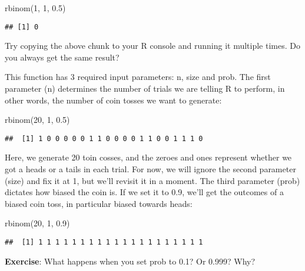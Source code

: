 \documentclass[
]{book}
\newenvironment{Shaded}{\begin{snugshade}}{\end{snugshade}}
\newcommand{\DecValTok}[1]{\textcolor[rgb]{0.00,0.00,0.81}{#1}}
\newcommand{\FloatTok}[1]{\textcolor[rgb]{0.00,0.00,0.81}{#1}}
\newcommand{\FunctionTok}[1]{\textcolor[rgb]{0.00,0.00,0.00}{#1}}
\newcommand{\NormalTok}[1]{#1}
\begin{document}
\begin{Shaded}
\begin{Highlighting}[]
\FunctionTok{rbinom}\NormalTok{(}\DecValTok{1}\NormalTok{, }\DecValTok{1}\NormalTok{, }\FloatTok{0.5}\NormalTok{)}
\end{Highlighting}
\end{Shaded}

\begin{verbatim}
## [1] 0
\end{verbatim}

Try copying the above chunk to your R console and running it multiple times. Do you always get the same result?

This function has 3 required input parameters: n, size and prob. The first parameter (n) determines the number of trials we are telling R to perform, in other words, the number of coin tosses we want to generate:

\begin{Shaded}
\begin{Highlighting}[]
\FunctionTok{rbinom}\NormalTok{(}\DecValTok{20}\NormalTok{, }\DecValTok{1}\NormalTok{, }\FloatTok{0.5}\NormalTok{)}
\end{Highlighting}
\end{Shaded}

\begin{verbatim}
##  [1] 1 0 0 0 0 0 1 1 0 0 0 0 1 1 0 0 1 1 1 0
\end{verbatim}

Here, we generate 20 toin cosses, and the zeroes and ones represent whether we got a heads or a tails in each trial. For now, we will ignore the second parameter (size) and fix it at 1, but we'll revisit it in a moment. The third parameter (prob) dictates how biased the coin is. If we set it to 0.9, we'll get the outcomes of a biased coin toss, in particular biased towards heads:

\begin{Shaded}
\begin{Highlighting}[]
\FunctionTok{rbinom}\NormalTok{(}\DecValTok{20}\NormalTok{, }\DecValTok{1}\NormalTok{, }\FloatTok{0.9}\NormalTok{)}
\end{Highlighting}
\end{Shaded}

\begin{verbatim}
##  [1] 1 1 1 1 1 1 1 1 1 1 1 1 1 1 1 1 1 1 1 1
\end{verbatim}

\textbf{Exercise}: What happens when you set prob to 0.1? Or 0.999? Why?
\end{document}
